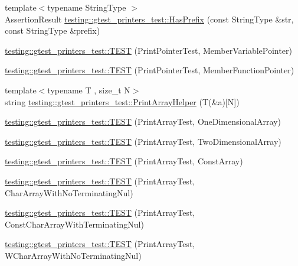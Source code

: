 \begin{DoxyCompactItemize}
\item 
{\footnotesize template$<$typename String\+Type $>$ }\\Assertion\+Result \hyperlink{namespacetesting_1_1gtest__printers__test_abbd436200da6c80944c8a7504fb56ea1}{testing\+::gtest\+\_\+printers\+\_\+test\+::\+Has\+Prefix} (const String\+Type \&str, const String\+Type \&prefix)
\item 
\hyperlink{namespacetesting_1_1gtest__printers__test_a434cafcc1dbee409992bbb1593034480}{testing\+::gtest\+\_\+printers\+\_\+test\+::\+T\+E\+ST} (Print\+Pointer\+Test, Member\+Variable\+Pointer)
\item 
\hyperlink{namespacetesting_1_1gtest__printers__test_a9d998b210890d3d7e085d01c457f650f}{testing\+::gtest\+\_\+printers\+\_\+test\+::\+T\+E\+ST} (Print\+Pointer\+Test, Member\+Function\+Pointer)
\item 
{\footnotesize template$<$typename T , size\+\_\+t N$>$ }\\string \hyperlink{namespacetesting_1_1gtest__printers__test_a10300ded1e327c98c6a36beb7ad49e58}{testing\+::gtest\+\_\+printers\+\_\+test\+::\+Print\+Array\+Helper} (T(\&a)\mbox{[}N\mbox{]})
\item 
\hyperlink{namespacetesting_1_1gtest__printers__test_a3845c4717b03cb5ad309c7d9a37acb0a}{testing\+::gtest\+\_\+printers\+\_\+test\+::\+T\+E\+ST} (Print\+Array\+Test, One\+Dimensional\+Array)
\item 
\hyperlink{namespacetesting_1_1gtest__printers__test_ac366b9ec749b2499d21583d3b8f86273}{testing\+::gtest\+\_\+printers\+\_\+test\+::\+T\+E\+ST} (Print\+Array\+Test, Two\+Dimensional\+Array)
\item 
\hyperlink{namespacetesting_1_1gtest__printers__test_a8b5638f178c12f58707ca0f02a3b4d41}{testing\+::gtest\+\_\+printers\+\_\+test\+::\+T\+E\+ST} (Print\+Array\+Test, Const\+Array)
\item 
\hyperlink{namespacetesting_1_1gtest__printers__test_a3bae023a42049745b49fa1f2db9a0cb2}{testing\+::gtest\+\_\+printers\+\_\+test\+::\+T\+E\+ST} (Print\+Array\+Test, Char\+Array\+With\+No\+Terminating\+Nul)
\item 
\hyperlink{namespacetesting_1_1gtest__printers__test_ab51b9ecaca7d635326101b23d5e8afd2}{testing\+::gtest\+\_\+printers\+\_\+test\+::\+T\+E\+ST} (Print\+Array\+Test, Const\+Char\+Array\+With\+Terminating\+Nul)
\item 
\hyperlink{namespacetesting_1_1gtest__printers__test_ac19ec2732031bfe83b30ea9f00259ef3}{testing\+::gtest\+\_\+printers\+\_\+test\+::\+T\+E\+ST} (Print\+Array\+Test, W\+Char\+Array\+With\+No\+Terminating\+Nul)

\end{DoxyCompactItemize}
